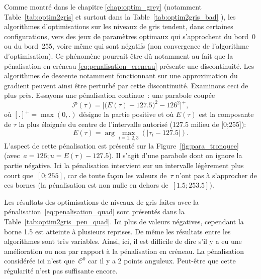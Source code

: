 \documentclass[main.tex]{subfiles}
\begin{document}
Comme montré dans le chapitre \ref{chap:optim_grey} (\cf notamment Table~\ref{tab:optim2gris} et surtout dans la Table~\ref{tab:optim2gris_bad} ), les algorithmes d'optimisations sur les niveaux de gris tendent, dans certaines configurations,  vers des jeux de paramètres optimaux qui s'approchent du bord~0 ou du bord~255, voire même qui sont négatifs (\ie non convergence de l'algorithme d'optimisation). Ce phénomène pourrait être dû notamment au fait que la pénalisation en créneau \eqref{eq:penalisation_creneau} présente une discontinuité. Les algorithmes de descente notamment fonctionnant sur une approximation du gradient peuvent ainsi être perturbé par cette discontinuité. Examinons ceci de plus près. Essayons une pénalisation continue~: une parabole coupée
\begin{equation}
\label{eq:penalisation_quad}
\mathcal{P}(\tau) = \Big[ \big(  E(\tau) - 127.5 \big)^2-126^2 \Big]^+,
\end{equation}
où $[.]^+=\max(0,.)$ désigne la partie positive et où $E(\tau)$ est la composante de $\tau$ la plus éloignée du centre de l'intervalle autorisé (127.5 milieu de [0;255]):
\begin{equation}
\label{eq:tau_eloigne} E(\tau)= \arg\max_{i=1,2,3}( | \tau_i-127.5 | ).
\end{equation} 
L'aspect de cette pénalisation est présenté sur la Figure~\ref{fig:para_tronquee} (avec~$a=126; u=E(\tau)-127.5$). Il s'agit d'une parabole dont on ignore la partie négative. 
Ici la pénalisation intervient sur un intervalle légèrement plus court que~$[0;255]$, car de toute façon les valeurs de~$\tau$ n'ont pas à s'approcher de ces bornes (la pénalisation est non nulle en dehors de~$[1.5;253.5]$).



Les résultats des optimisations de niveaux de gris faites avec la pénalisation~\eqref{eq:penalisation_quad} sont présentés dans la Table~\ref{tab:optim2gris_pen_quad}. Ici plus de valeurs négatives, cependant la borne 1.5 est atteinte à plusieurs reprises. De même les résultats entre les algorithmes sont très variables. Ainsi, ici, il est difficile de dire s'il y a eu une amélioration ou non par rapport à la pénalisation en créneau. 
La pénalisation considérée ici n'est que~$\mathcal{C}^0$ car il y a 2 points anguleux. Peut-être que cette régularité n'est pas suffisante encore.
\end{document}
